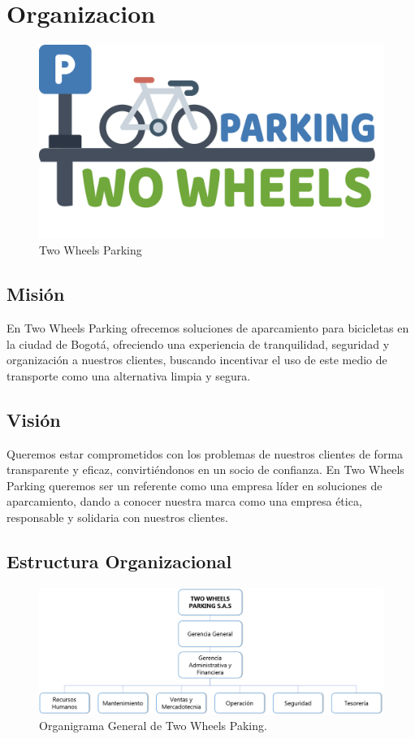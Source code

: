 \chapter{Organizacion}

\begin{figure}[H]
	\centering
	\includegraphics[scale=0.5]{imagenes/logoTWP}
	\caption{Two Wheels Parking}
	\label{fig:logotwp}
\end{figure}


\section{Misión}
En Two Wheels Parking ofrecemos soluciones de aparcamiento para bicicletas en la ciudad de Bogotá, ofreciendo una experiencia de tranquilidad, seguridad y organización a nuestros clientes,  buscando incentivar el uso de este medio de transporte como una alternativa limpia y segura.\\

\section{Visión}
Queremos estar comprometidos con los problemas de nuestros clientes de forma transparente y eficaz, convirtiéndonos en un socio de confianza. En Two Wheels Parking queremos ser un referente como una empresa líder en soluciones de aparcamiento, dando a conocer nuestra marca como una empresa ética, responsable y solidaria con nuestros clientes.\\

\section{Estructura Organizacional}
\begin{figure}[H]
	\centering
	\includegraphics[width=0.7\linewidth]{imagenes/organigrama}
	\caption{Organigrama General de Two Wheels Paking.}
	\label{fig:organigrama}
\end{figure}

